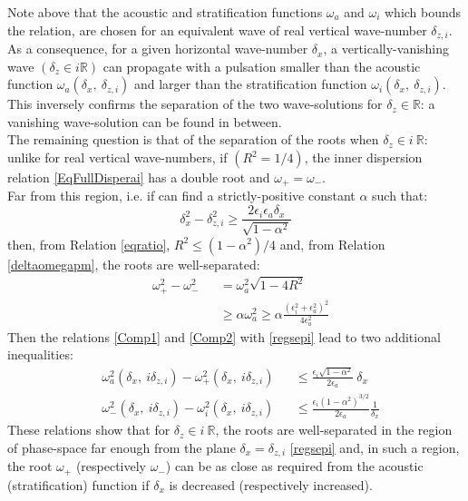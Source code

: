 \documentclass[a4paper,11pt]{article}
\begin{document}
Note above that the acoustic and stratification functions $\omega_a$ and $\omega_i$ which bounds the relation, are chosen for an equivalent wave of real vertical wave-number $\delta_{z,i}$.
As a consequence, for a given horizontal wave-number $\delta_x$, a vertically-vanishing wave $(\delta_z\in i\mathbb{R})$ can propagate with a pulsation smaller than the acoustic function $\omega_{a}(\delta_x,\ \delta_{z,i})$ and larger than the stratification function $\omega_{i}(\delta_x,\ \delta_{z,i})$. This inversely confirms the separation of the two wave-solutions for $\delta_z\in \mathbb{R}$: a vanishing wave-solution can be found in between.\\
The remaining question is that of the separation of the roots when $\delta_z\in i\ \mathbb{R}$: unlike for real vertical wave-numbers, if  $(R^2=1/4)$, the inner dispersion relation \ref{EqFullDisperai} has a double root and $\omega_+ = \omega_-$.\\
Far from this region, i.e. if can find a strictly-positive constant $\alpha$ such that:
\begin{equation}
	\label{regsepi}
	\delta_x^2-\delta_{z,i}^2\geq
	\frac{2\epsilon_i\epsilon_a\delta_x}
	{\sqrt{1-\alpha^2}}
\end{equation}
then, from Relation \ref{eqratio}, $R^2\leq (1-\alpha^2)/4$ and, from Relation \ref{deltaomegapm}, the roots are well-separated:
\begin{subequations}
	\begin{alignat}{2}	
	&\omega_{+}^2-\omega_{-}^2 &&=\omega_a^2\sqrt{1-4 R^2}\\[3mm]
	& &&\geq \alpha\omega_a^2 
	\geq \alpha\frac{(\epsilon_i^2+\epsilon_a^2)^2}{4\epsilon_a^2}
	\end{alignat}
\end{subequations}
Then the relations \ref{Comp1} and \ref{Comp2} with \ref{regsepi} lead to two additional inequalities:
\begin{subequations}
	\begin{alignat}{2}
	\label{Comp1b}
	&\omega_a^2(\delta_x,\ i\delta_{z,i})-\omega_{+}^2(\delta_x,\ i\delta_{z,i})
	&&\leq\frac{\epsilon_i\sqrt{1-\alpha^2}}{2\epsilon_a}\ \delta_x\\[3mm]
	\label{Comp2b}
	&\omega_{-}^2(\delta_x,\ i\delta_{z,i})-\omega_i^2(\delta_x,\ i\delta_{z,i})
	&& \leq\frac{\epsilon_i (1-\alpha^2)^{3/2}}{2\epsilon_a}\frac{1}{\delta_x}
	\end{alignat}	
\end{subequations}
These relations show that for $\delta_z\in i\ \mathbb{R}$, the roots are well-separated in the region of phase-space far enough from the plane $\delta_x=\delta_{z,i}$ \ref{regsepi} and, in such a region, the root $\omega_+$ (respectively $\omega_-$) can be as close as required from the acoustic (stratification) function if $\delta_x$ is decreased (respectively increased).
\end{document}
